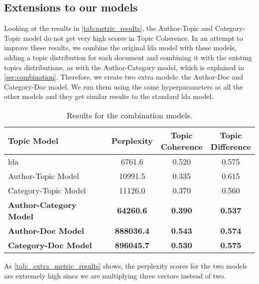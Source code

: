 \subsection{Extensions to our models}\label{subsec:app_exten_models}
Looking at the results in \autoref{tab:metric_results}, the Author-Topic and Category-Topic model do not get very high scores in Topic Coherence.
In an attempt to improve these results, we combine the original \gls{lda} model with these models, adding a topic distribution for each document and combining it with the existing topics distributions, as with the Author-Category model, which is explained in \autoref{sec:combination}.
Therefore, we create two extra models: the Author-Doc and Category-Doc model.
We run them using the same hyperparameters as all the other models and they get similar results to the standard \gls{lda} model.

\begin{table}[h]
	\centering
	\caption{Results for the combination models.}
	\label{tab:_extra_metric_results}
	\begin{tabular}{l|c|c|c}
		Topic Model & Perplexity & \makecell{Topic \\ Coherence} & \makecell{Topic \\ Difference} \\
		\midrule
		\Acrlong{lda} & 6761.6 & 0.520 & 0.575 \\
		Author-Topic Model & 10991.5 & 0.335 & 0.615 \\
		Category-Topic Model & 11126.0 & 0.370 & 0.560 \\
		\textbf{Author-Category Model} & \textbf{64260.6} & \textbf{0.390} & \textbf{0.537} \\
		\textbf{Author-Doc Model} & \textbf{888036.4} & \textbf{0.543} & \textbf{0.574} \\
		\textbf{Category-Doc Model} & \textbf{896045.7} &\textbf{ 0.530} & \textbf{0.575} \\
	\end{tabular}
\end{table}

As \autoref{tab:_extra_metric_results} shows, the perplexity scores for the two models are extremely high since we are multiplying three vectors instead of two.

